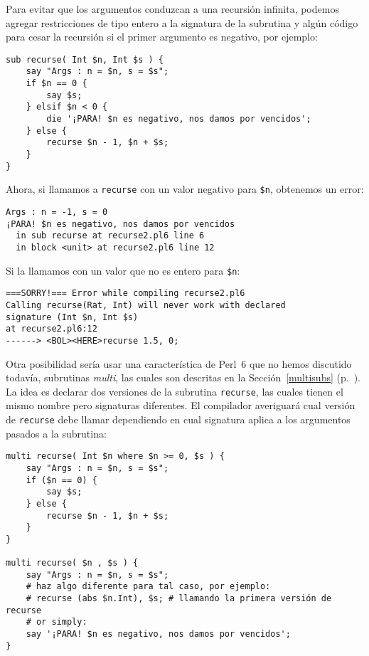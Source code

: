 Para evitar que los argumentos conduzcan a una recursión infinita,
podemos agregar restricciones de tipo entero a la signatura de la
subrutina y algún código para cesar la recursión si el primer 
argumento es negativo, por ejemplo:

\begin{verbatim}
sub recurse( Int $n, Int $s ) {
    say "Args : n = $n, s = $s";
    if $n == 0 {
        say $s;
    } elsif $n < 0 {
        die '¡PARA! $n es negativo, nos damos por vencidos';
    } else {
        recurse $n - 1, $n + $s;
    }
}
\end{verbatim}
%

Ahora, si llamamos a {\tt recurse} con un valor negativo para \verb|$n|,
obtenemos un error:

\begin{verbatim}
Args : n = -1, s = 0
¡PARA! $n es negativo, nos damos por vencidos
  in sub recurse at recurse2.pl6 line 6
  in block <unit> at recurse2.pl6 line 12
\end{verbatim}
%

Si la llamamos con un valor que no es entero para \verb|$n|:

\begin{verbatim}
===SORRY!=== Error while compiling recurse2.pl6
Calling recurse(Rat, Int) will never work with declared
signature (Int $n, Int $s)
at recurse2.pl6:12
------> <BOL><HERE>recurse 1.5, 0;
\end{verbatim}
%

Otra posibilidad sería usar una característica de Perl~6 que no
hemos discutido todavía, subrutinas \emph{multi}, las cuales
son descritas en la Sección~\ref{multisubs} (p.~\pageref{multisubs}).
La idea es declarar dos versiones de la subrutina {\tt recurse},
las cuales tienen el mismo nombre pero signaturas diferentes. 
El compilador averiguará cual versión de {\tt recurse} debe llamar
dependiendo en cual signatura aplica a los argumentos pasados 
a la subrutina:

\begin{verbatim}
multi recurse( Int $n where $n >= 0, $s ) {
    say "Args : n = $n, s = $s";
    if ($n == 0) {
        say $s;
    } else {
        recurse $n - 1, $n + $s;
    }
}

multi recurse( $n , $s ) {
    say "Args : n = $n, s = $s";
    # haz algo diferente para tal caso, por ejemplo:
    # recurse (abs $n.Int), $s; # llamando la primera versión de recurse
    # or simply:
    say '¡PARA! $n es negativo, nos damos por vencidos';
}
\end{verbatim}

